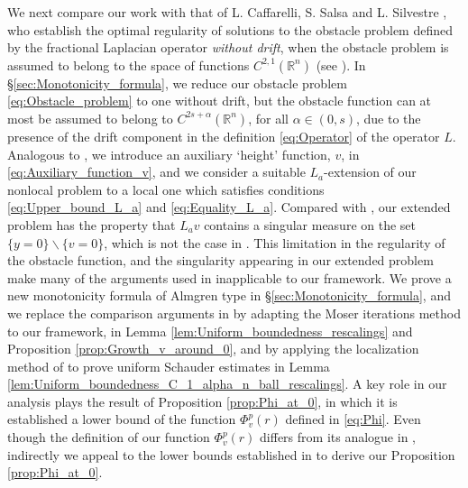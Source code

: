 \documentclass[11pt,reqno]{amsart}
\theoremstyle{definition}
\theoremstyle{remark}
\begin{document}
We next compare our work with that of L. Caffarelli, S. Salsa and L. Silvestre \cite{Caffarelli_Salsa_Silvestre_2008}, who establish the optimal regularity of solutions to the obstacle problem defined by the fractional Laplacian operator \emph{without drift}, when the obstacle problem is assumed to belong to the space of functions $C^{2,1}({\mathbb{R}}^n)$ (see \cite[Corollary 6.8]{Caffarelli_Salsa_Silvestre_2008}). In \S \ref{sec:Monotonicity_formula}, we reduce our obstacle problem \eqref{eq:Obstacle_problem} to one without drift, but the obstacle function can at most be assumed to belong to $C^{2s+\alpha}({\mathbb{R}}^n)$, for all $\alpha\in (0,s)$, due to the presence of the drift component in the definition \eqref{eq:Operator} of the operator $L$. Analogous to \cite{Caffarelli_Salsa_Silvestre_2008}, we introduce an auxiliary `height' function, $v$, in \eqref{eq:Auxiliary_function_v}, and we consider a suitable $L_a$-extension of our nonlocal problem to a local one which satisfies conditions \eqref{eq:Upper_bound_L_a} and \eqref{eq:Equality_L_a}. Compared with \cite[Conditions (2.2)-(2.5)]{Caffarelli_Salsa_Silvestre_2008}, our extended problem has the property that $L_a v$ contains a singular measure on the set $\{y=0\}\backslash\{v=0\}$, which is not the case in \cite{Caffarelli_Salsa_Silvestre_2008}. This limitation in the regularity of the obstacle function, and the singularity appearing in our extended problem make many of the arguments used in \cite{Caffarelli_Salsa_Silvestre_2008} inapplicable to our framework. We prove a new monotonicity formula of Almgren type in \S \ref{sec:Monotonicity_formula}, and we replace the comparison arguments in \cite{Caffarelli_Salsa_Silvestre_2008} by adapting the Moser iterations method to our framework, in Lemma \ref{lem:Uniform_boundedness_rescalings} and Proposition \ref{prop:Growth_v_around_0}, and by applying the localization method of \cite[Theorem 8.11.1]{Krylov_LecturesHolder} to prove uniform Schauder estimates in Lemma \ref{lem:Uniform_boundedness_C_1_alpha_n_ball_rescalings}. A key role in our analysis plays the result of Proposition \ref{prop:Phi_at_0}, in which it is established a lower bound of the function $\Phi_v^p(r)$ defined in \eqref{eq:Phi}. Even though the definition of our function $\Phi_v^p(r)$ differs from its analogue in \cite[\S 3]{Caffarelli_Salsa_Silvestre_2008}, indirectly we appeal to the lower bounds established in \cite[Lemma 6.1]{Caffarelli_Salsa_Silvestre_2008} to derive our Proposition \ref{prop:Phi_at_0}.
\end{document}
